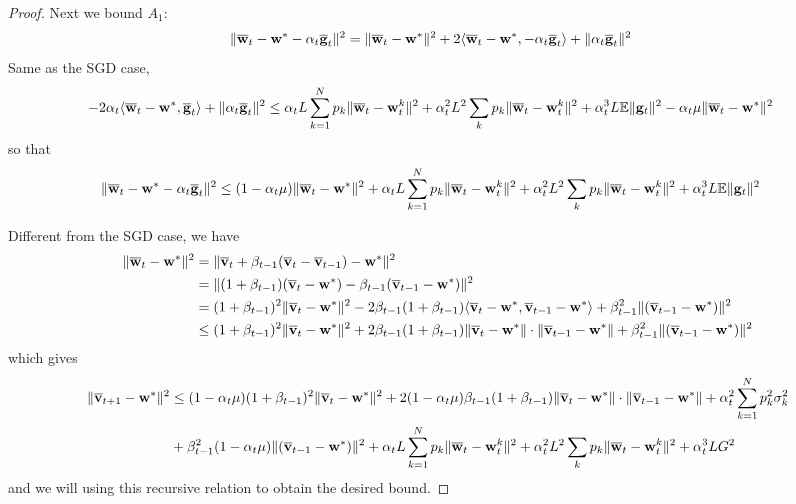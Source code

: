 \begin{proof}
Next we bound $A_{1}$: 
\begin{align*}
\|{\overline{\mathbf{w}}}_{t}-{\mathbf{w}}^{\ast}-\alpha_{t}{\overline{\mathbf{g}}}_{t}\|^{2} & =\|{\overline{\mathbf{w}}}_{t}-{\mathbf{w}}^{\ast}\|^{2}+2\langle{\overline{\mathbf{w}}}_{t}-{\mathbf{w}}^{\ast},-\alpha_{t}{\overline{\mathbf{g}}}_{t}\rangle+\|\alpha_{t}{\overline{\mathbf{g}}}_{t}\|^{2}
\end{align*}
Same as the SGD case, 
\begin{align*}
-2\alpha_{t}\langle{\overline{\mathbf{w}}}_{t}-{\mathbf{w}}^{\ast},{\overline{\mathbf{g}}}_{t}\rangle+\|\alpha_{t}{\overline{\mathbf{g}}}_{t}\|^{2} & \leq\alpha_{t}L\sum_{k=1}^{N}p_{k}\|{\overline{\mathbf{w}}}_{t}-{\mathbf{w}}_{t}^{k}\|^{2}+\alpha_{t}^{2}L^{2}\sum_{k}p_{k}\|{\overline{\mathbf{w}}}_{t}-{\mathbf{w}}_{t}^{k}\|^{2}+\alpha_{t}^{3}L\mathbb{E}\|{\mathbf{g}}_{t}\|^{2}-\alpha_{t}\mu\|{\overline{\mathbf{w}}}_{t}-{\mathbf{w}}^{\ast}\|^{2}
\end{align*}
so that 
\begin{align*}
\|{\overline{\mathbf{w}}}_{t}-{\mathbf{w}}^{\ast}-\alpha_{t}{\overline{\mathbf{g}}}_{t}\|^{2} & \leq(1-\alpha_{t}\mu)\|{\overline{\mathbf{w}}}_{t}-{\mathbf{w}}^{\ast}\|^{2}+\alpha_{t}L\sum_{k=1}^{N}p_{k}\|{\overline{\mathbf{w}}}_{t}-{\mathbf{w}}_{t}^{k}\|^{2}+\alpha_{t}^{2}L^{2}\sum_{k}p_{k}\|{\overline{\mathbf{w}}}_{t}-{\mathbf{w}}_{t}^{k}\|^{2}+\alpha_{t}^{3}L\mathbb{E}\|{\mathbf{g}}_{t}\|^{2}
\end{align*}

Different from the SGD case, we have 
\begin{align*}
\|{\overline{\mathbf{w}}}_{t}-{\mathbf{w}}^{\ast}\|^{2} & =\|{\overline{\mathbf{v}}}_{t}+\beta_{t-1}({\overline{\mathbf{v}}}_{t}-{\overline{\mathbf{v}}}_{t-1})-{\mathbf{w}}^{\ast}\|^{2}\\
& =\|(1+\beta_{t-1})({\overline{\mathbf{v}}}_{t}-{\mathbf{w}}^{\ast})-\beta_{t-1}({\overline{\mathbf{v}}}_{t-1}-{\mathbf{w}}^{\ast})\|^{2}\\
& =(1+\beta_{t-1})^{2}\|{\overline{\mathbf{v}}}_{t}-{\mathbf{w}}^{\ast}\|^{2}-2\beta_{t-1}(1+\beta_{t-1})\langle{\overline{\mathbf{v}}}_{t}-{\mathbf{w}}^{\ast},{\overline{\mathbf{v}}}_{t-1}-{\mathbf{w}}^{\ast}\rangle+\beta_{t-1}^{2}\|({\overline{\mathbf{v}}}_{t-1}-{\mathbf{w}}^{\ast})\|^{2}\\
& \leq(1+\beta_{t-1})^{2}\|{\overline{\mathbf{v}}}_{t}-{\mathbf{w}}^{\ast}\|^{2}+2\beta_{t-1}(1+\beta_{t-1})\|{\overline{\mathbf{v}}}_{t}-{\mathbf{w}}^{\ast}\|\cdot\|{\overline{\mathbf{v}}}_{t-1}-{\mathbf{w}}^{\ast}\|+\beta_{t-1}^{2}\|({\overline{\mathbf{v}}}_{t-1}-{\mathbf{w}}^{\ast})\|^{2}
\end{align*}
which gives 
\begin{align*}
\|{\overline{\mathbf{v}}}_{t+1}-{\mathbf{w}}^{\ast}\|^{2} & \leq(1-\alpha_{t}\mu)(1+\beta_{t-1})^{2}\|{\overline{\mathbf{v}}}_{t}-{\mathbf{w}}^{\ast}\|^{2}+2(1-\alpha_{t}\mu)\beta_{t-1}(1+\beta_{t-1})\|{\overline{\mathbf{v}}}_{t}-{\mathbf{w}}^{\ast}\|\cdot\|{\overline{\mathbf{v}}}_{t-1}-{\mathbf{w}}^{\ast}\|+\alpha_{t}^{2}\sum_{k=1}^{N}p_{k}^{2}\sigma_{k}^{2}\\
& +\beta_{t-1}^{2}(1-\alpha_{t}\mu)\|({\overline{\mathbf{v}}}_{t-1}-{\mathbf{w}}^{\ast})\|^{2}+\alpha_{t}L\sum_{k=1}^{N}p_{k}\|{\overline{\mathbf{w}}}_{t}-{\mathbf{w}}_{t}^{k}\|^{2}+\alpha_{t}^{2}L^{2}\sum_{k}p_{k}\|{\overline{\mathbf{w}}}_{t}-{\mathbf{w}}_{t}^{k}\|^{2}+\alpha_{t}^{3}LG^{2}
\end{align*}
and we will using this recursive relation to obtain the desired bound. 


\end{proof}
